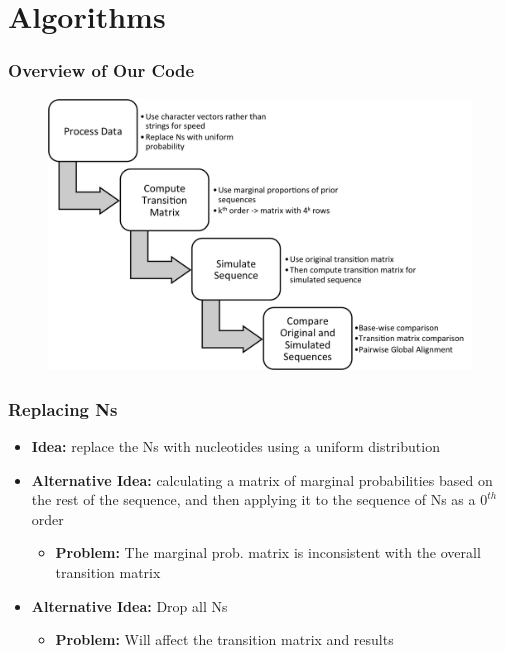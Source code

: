\documentclass[xcolor=dvipsnames]{beamer} \usepackage{beamerthemesplit}
\begin{document}
\section{Algorithms}
\begin{frame}
	\frametitle{Overview of Our Code}
	\begin{figure}
        \centering
        \includegraphics[scale=0.4]{algorithm_flowchart.png}
    \end{figure}
\end{frame}

\begin{frame}
	\frametitle{Replacing Ns}
    \begin{itemize}
    	\item \textbf{Idea:} replace the Ns with nucleotides using a uniform distribution
    	\item \textbf{Alternative Idea:} calculating a matrix of marginal probabilities based on the rest of the sequence, and then applying it to the sequence of Ns as a $0^{th}$ order
        \begin{itemize}
        	\item \textbf{Problem:} The marginal prob. matrix is inconsistent with the overall transition matrix
        \end{itemize}
	   	\item \textbf{Alternative Idea:} Drop all Ns
        \begin{itemize}
        	\item \textbf{Problem:} Will affect the transition matrix and results
        \end{itemize}

    \end{itemize}
\end{frame}
\end{document}
